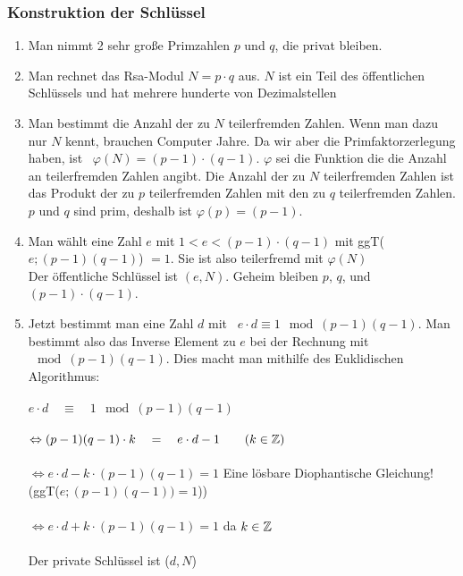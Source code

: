 \documentclass[../MAIN/main.tex]{subfiles}
\begin{document}
\subsubsection{Konstruktion der Schlüssel}

\begin{enumerate}
\item Man nimmt 2 sehr große Primzahlen $p$ und $q$, die privat bleiben.\\
\item Man rechnet das Rsa-Modul $N=p \cdot q$ aus. $N$ ist ein Teil des öffentlichen Schlüssels und hat mehrere hunderte von Dezimalstellen\\
\item Man bestimmt die Anzahl der zu $N$ teilerfremden Zahlen. Wenn man dazu nur $N$ kennt, brauchen Computer Jahre. Da wir aber die Primfaktorzerlegung haben, ist \, $\varphi(N) = (p - 1) \cdot (q - 1)$. $\varphi$ sei die Funktion die die Anzahl an teilerfremden Zahlen angibt. Die Anzahl der zu $N$ teilerfremden Zahlen ist das Produkt der zu $p$ teilerfremden Zahlen mit den zu $q$ teilerfremden Zahlen. $p$ und $q$ sind prim, deshalb ist $\varphi(p)=(p - 1)$.
\item Man wählt eine Zahl $e$ mit $1<e<(p-1)\cdot(q-1)$ mit ggT($e;(p-1)(q-1)$) $= 1$. Sie ist also teilerfremd mit $\varphi(N)$\\
Der öffentliche Schlüssel ist $(e,N)$. Geheim bleiben $p$, $q$, und $(p - 1) \cdot (q-1)$.
\item Jetzt bestimmt man eine Zahl $d$ mit \, $e \cdot d \equiv 1 \mod (p-1)(q-1)$. Man bestimmt also das Inverse Element zu $e$ bei der Rechnung mit $\mod (p-1)(q-1)$. Dies macht man mithilfe des Euklidischen Algorithmus:\\\\
$e \cdot d \quad \equiv \quad 1 \mod (p-1)(q-1) $\\\\
$\Leftrightarrow (p-1)(q-1) \cdot k \quad = \quad e \cdot d -1 \qquad (k \in \mathbb{Z})$\\\\
$\Leftrightarrow e \cdot d - k \cdot (p-1)(q-1) = 1$ \qquad Eine lösbare Diophantische Gleichung! (ggT($e;(p-1)(q-1)) = 1$))\\\\
$\Leftrightarrow e \cdot d + k \cdot (p-1)(q-1) = 1$ \qquad da $k \in \mathbb{Z}$\\\\
Der private Schlüssel ist ($d,N$)
\end{enumerate}\\
\end{document}
